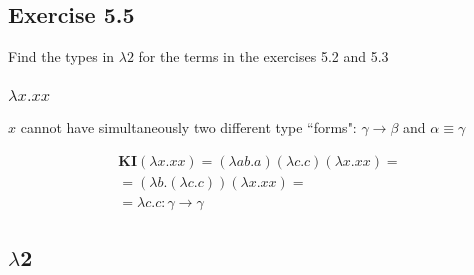 \documentclass[11pt]{article}
\begin{document}
\begin{center}

\DP
\end{center}

\subsection*{Exercise 5.5}
Find the types in $\lambda 2$ for the terms in the exercises 5.2 and 5.3

\subsubsection*{$\lambda x.xx$}

\begin{center}
 

\DP
\end{center}

$x$ cannot have simultaneously two different type ``forms": $\gamma \rightarrow \beta$ and $\alpha \equiv \gamma$

\begin{gather*}
\mathbf{KI}(\lambda x.xx) = (\lambda ab.a) (\lambda c.c) (\lambda x.xx) = \\
= (\lambda b.(\lambda c.c))(\lambda x.xx) = \\
= \lambda c.c : \gamma \rightarrow \gamma 
\end{gather*}

\subsection*{$\lambda$2}

\begin{prooftree}
\end{prooftree}

\begin{prooftree}
\end{prooftree}
\end{document}
